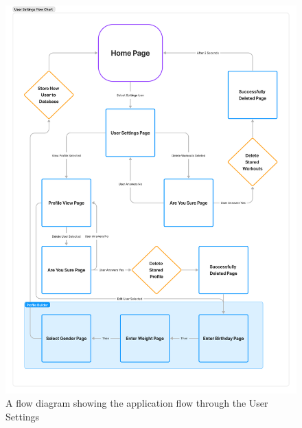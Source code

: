 \documentclass{l4proj}
\begin{document}
\begin{figure}[h!]
    \centering
    \includegraphics[width=1\linewidth]{dissertation//dissImages/UserSettingFlow.pdf}
    \caption{A flow diagram showing the application flow through the User Settings}
    \label{fig:usersettingsflow}
\end{figure}
\end{document}
